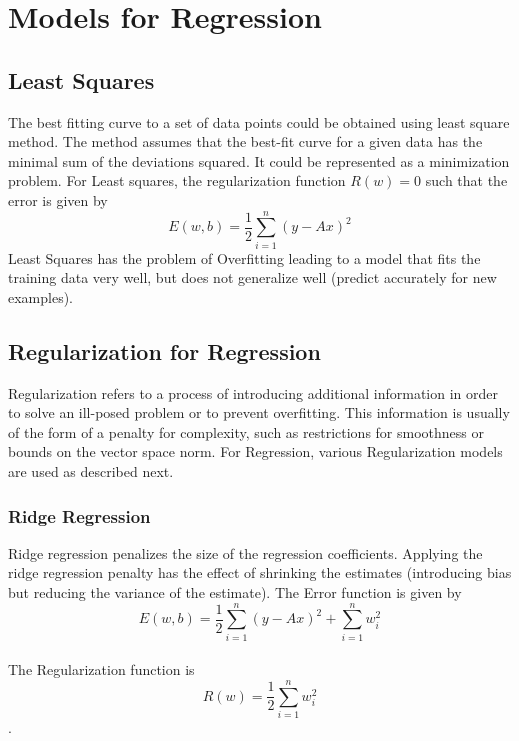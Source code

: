 \documentclass{sigplanconf}
\begin{document}
\section{Models for Regression}
\subsection{Least Squares}
The best fitting curve to a set of data points could be obtained using least square method. The method
assumes that the best-fit curve for a given data has the minimal sum of the deviations squared. It could
be represented as a minimization problem. For Least squares, the regularization function \begin{math}R(w)=0\end{math}
such that the error is given by \\
\begin{equation} E(w,b) =\frac{1}{2} \sum_{i=1}^{n} (y-Ax)^2\end{equation}
Least Squares has the problem of Overfitting leading to a model that fits the training data very well, but does not generalize well (predict accurately for new examples).

\subsection{Regularization for Regression}
Regularization refers to a process of introducing additional information in order to solve an ill-posed problem or to prevent overfitting. 
This information is usually of the form of a penalty for complexity, such as restrictions for smoothness or bounds on the vector space norm.
For Regression, various Regularization models are used as described next.

\subsubsection{Ridge Regression}
Ridge regression penalizes the size of the regression coefficients. Applying the ridge regression penalty
has the effect of shrinking the estimates (introducing bias but reducing the variance of the estimate). The Error
function is given by \\
\begin{equation} E(w,b) =\frac{1}{2} \sum_{i=1}^{n} (y-Ax)^2 + \sum_{i=1}^{n} w_i^2 \end{equation} \\
The Regularization function is
\begin{equation}R(w)=\frac{1}{2} \sum_{i=1}^{n} w_i^2\end{equation}.
\end{document}
